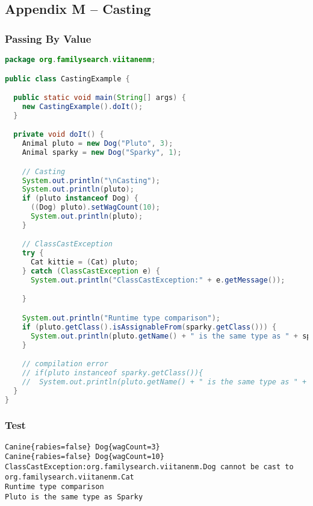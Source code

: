 \subsection*{Appendix M -- Casting}
\subsubsection{Passing By Value}\label{App:AppendixM}
\begin{lstlisting}[language=Java]
package org.familysearch.viitanenm;

public class CastingExample {

  public static void main(String[] args) {
    new CastingExample().doIt();
  }

  private void doIt() {
    Animal pluto = new Dog("Pluto", 3);
    Animal sparky = new Dog("Sparky", 1);

    // Casting
    System.out.println("\nCasting");
    System.out.println(pluto);
    if (pluto instanceof Dog) {
      ((Dog) pluto).setWagCount(10);
      System.out.println(pluto);
    }

    // ClassCastException
    try {
      Cat kittie = (Cat) pluto;
    } catch (ClassCastException e) {
      System.out.println("ClassCastException:" + e.getMessage());

    }

    System.out.println("Runtime type comparison");
    if (pluto.getClass().isAssignableFrom(sparky.getClass())) {
      System.out.println(pluto.getName() + " is the same type as " + sparky.getName());
    }

    // compilation error
    // if(pluto instanceof sparky.getClass()){
    //  System.out.println(pluto.getName() + " is the same type as " + sparky.getName());
  }
}

\end{lstlisting}

\subsubsection{Test}\label{App:AppendixMResults}
\begin{lstlisting}
Canine{rabies=false} Dog{wagCount=3}
Canine{rabies=false} Dog{wagCount=10}
ClassCastException:org.familysearch.viitanenm.Dog cannot be cast to org.familysearch.viitanenm.Cat
Runtime type comparison
Pluto is the same type as Sparky
\end{lstlisting}